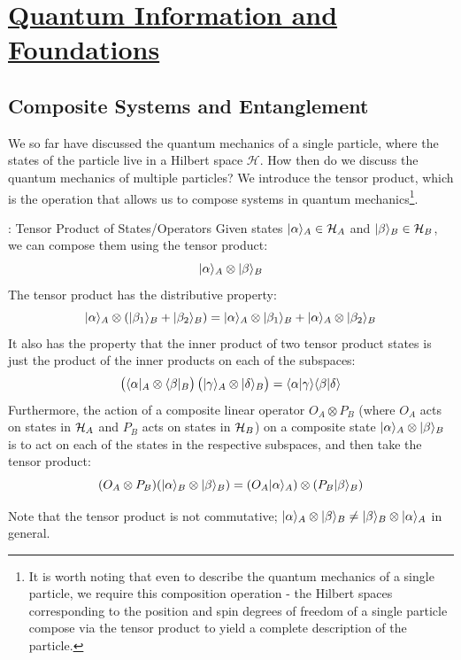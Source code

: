 \section[Quantum Information and Foundations]{\hyperlink{toc}{Quantum Information and Foundations}}

\subsection{Composite Systems and Entanglement}
We so far have discussed the quantum mechanics of a single particle, where the states of the particle live in a Hilbert space $\mathcal{H}$. How then do we discuss the quantum mechanics of multiple particles? We introduce the tensor product, which is the operation that allows us to compose systems in quantum mechanics\footnote{It is worth noting that even to describe the quantum mechanics of a single particle, we require this composition operation - the Hilbert spaces corresponding to the position and spin degrees of freedom of a single particle compose via the tensor product to yield a complete description of the particle.}. 

\begin{defbox}{: Tensor Product of States/Operators}
    Given states $\lvert \alpha \rangle_A \in \mathcal{H}_A$ and $\lvert \beta \rangle_B \in \mathcal{H}_B$, we can compose them using the tensor product: 
    \begin{equation}
        \lvert \alpha \rangle_A \otimes \lvert \beta \rangle_B
    \end{equation}
    The tensor product has the distributive property:
    \begin{equation}
        \lvert \alpha \rangle_A \otimes (\lvert \beta_1 \rangle_B + \lvert \beta_2 \rangle_B) = \lvert \alpha \rangle_A \otimes \lvert \beta_1 \rangle_B + \lvert \alpha \rangle_A \otimes \lvert \beta_2 \rangle_B
    \end{equation}
    It also has the property that the inner product of two tensor product states is just the product of the inner products on each of the subspaces:
    \begin{equation}
        \left(\langle \alpha \rvert_A \otimes \langle \beta \rvert_B \right) \left(\lvert \gamma \rangle_A \otimes \lvert \delta \rangle_B\right) = \langle \alpha \lvert \gamma \rangle \langle \beta \lvert \delta \rangle
    \end{equation}
    Furthermore, the action of a composite linear operator $O_A \otimes P_B$ (where $O_A$ acts on states in $\mathcal{H}_A$ and $P_B$ acts on states in $\mathcal{H}_B$) on a composite state $\lvert \alpha \rangle_A \otimes \lvert \beta \rangle_B$ is to act on each of the states in the respective subspaces, and then take the tensor product:
    \begin{equation}
        (O_A \otimes P_B)(\lvert \alpha \rangle_B \otimes \lvert \beta \rangle_B) = (O_A\lvert \alpha \rangle_A) \otimes (P_B\lvert \beta \rangle_B)
    \end{equation}
\end{defbox}
Note that the tensor product is not commutative; $\lvert \alpha \rangle_A \otimes \lvert \beta \rangle_B \neq \lvert \beta \rangle_B \otimes \lvert \alpha \rangle_A$ in general.

